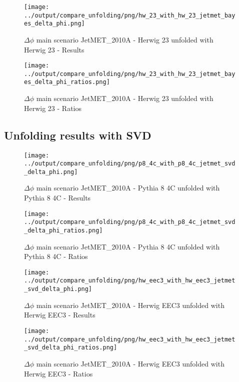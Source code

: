 \documentclass[11pt]{book}
\begin{document}
\begin{figure}[ht]
\centering
\texttt{[image: ../output/compare\_unfolding/png/hw\_23\_with\_hw\_23\_jetmet\_bayes\_delta\_phi.png]}
\caption{$\Delta\phi$ main scenario JetMET\_2010A - Herwig 23 unfolded with Herwig 23 - Results}
\label{hw_23_hw_23_jetmet_delta_phi_a}
\end{figure}

\begin{figure}[ht]
\centering
\texttt{[image: ../output/compare\_unfolding/png/hw\_23\_with\_hw\_23\_jetmet\_bayes\_delta\_phi\_ratios.png]}
\caption{$\Delta\phi$ main scenario JetMET\_2010A - Herwig 23 unfolded with Herwig 23 - Ratios}
\label{hw_23_jetmet_delta_phi_b}
\end{figure}

\clearpage
\subsection{Unfolding results with SVD}

\begin{figure}[ht]
\centering
\texttt{[image: ../output/compare\_unfolding/png/p8\_4c\_with\_p8\_4c\_jetmet\_svd\_delta\_phi.png]}
\caption{$\Delta\phi$ main scenario JetMET\_2010A - Pythia 8 4C unfolded with Pythia 8 4C - Results}
\label{p8_p8_jetmet_svd_delta_phi_a}
\end{figure}

\begin{figure}[ht]
\centering
\texttt{[image: ../output/compare\_unfolding/png/p8\_4c\_with\_p8\_4c\_jetmet\_svd\_delta\_phi\_ratios.png]}
\caption{$\Delta\phi$ main scenario JetMET\_2010A - Pythia 8 4C unfolded with Pythia 8 4C - Ratios}
\label{p8_p8_jetmet_svd_delta_phi_b}
\end{figure}

\begin{figure}[ht]
\centering
\texttt{[image: ../output/compare\_unfolding/png/hw\_eec3\_with\_hw\_eec3\_jetmet\_svd\_delta\_phi.png]}
\caption{$\Delta\phi$ main scenario JetMET\_2010A - Herwig EEC3 unfolded with Herwig EEC3 - Results}
\label{hw_eec3_hw_eec3_jetmet_svd_delta_phi_a}
\end{figure}

\begin{figure}[ht]
\centering
\texttt{[image: ../output/compare\_unfolding/png/hw\_eec3\_with\_hw\_eec3\_jetmet\_svd\_delta\_phi\_ratios.png]}
\caption{$\Delta\phi$ main scenario JetMET\_2010A - Herwig EEC3 unfolded with Herwig EEC3 - Ratios}
\label{hw_eec3_jetmet_svd_delta_phi_b}
\end{figure}
\end{document}
